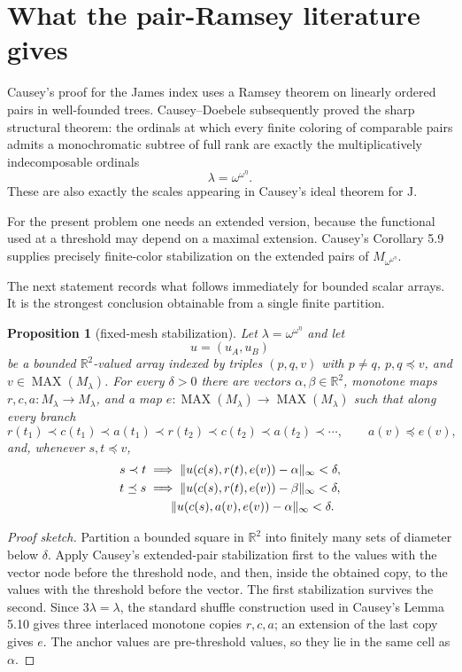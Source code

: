 \documentclass[11pt]{article}
\newtheorem{proposition}[theorem]{Proposition}
\theoremstyle{definition}
\theoremstyle{remark}
\newcommand{\J}{\mathrm{J}}
\newcommand{\MAX}{\operatorname{MAX}}
\newcommand{\R}{\mathbb R}
\begin{document}
\section{What the pair-Ramsey literature gives}

Causey's proof for the James index uses a Ramsey theorem on linearly ordered pairs in well-founded trees.  Causey--Doebele subsequently proved the sharp structural theorem: the ordinals at which every finite coloring of comparable pairs admits a monochromatic subtree of full rank are exactly the multiplicatively indecomposable ordinals
\[
   \lambda=\omega^{\omega^\eta}.
\]
These are also exactly the scales appearing in Causey's ideal theorem for $\J$.

For the present problem one needs an extended version, because the functional used at a threshold may depend on a maximal extension.  Causey's Corollary 5.9 supplies precisely finite-color stabilization on the extended pairs of $M_{\omega^{\omega^\eta}}$.

The next statement records what follows immediately for bounded scalar arrays.  It is the strongest conclusion obtainable from a single finite partition.

\begin{proposition}[fixed-mesh stabilization]\label{prop:fixed-mesh}
Let $\lambda=\omega^{\omega^\eta}$ and let
\[
   u=(u_A,u_B)
\]
be a bounded $\R^2$-valued array indexed by triples $(p,q,v)$ with $p\neq q$, $p,q\preceq v$, and $v\in\MAX(M_\lambda)$.  For every $\delta>0$ there are vectors $\alpha,\beta\in\R^2$, monotone maps $r,c,a:M_\lambda\to M_\lambda$, and a map $e:\MAX(M_\lambda)\to\MAX(M_\lambda)$ such that along every branch
\[
 r(t_1)\prec c(t_1)\prec a(t_1)\prec r(t_2)\prec c(t_2)\prec a(t_2)\prec\cdots,
 \qquad a(v)\preceq e(v),
\]
and, whenever $s,t\preceq v$,
\begin{align*}
 s\prec t&\implies
   \|u(c(s),r(t),e(v))-\alpha\|_\infty<\delta,\\
 t\preceq s&\implies
   \|u(c(s),r(t),e(v))-\beta\|_\infty<\delta,\\
 &\hspace{7mm}\|u(c(s),a(v),e(v))-\alpha\|_\infty<\delta.
\end{align*}
\end{proposition}

\begin{proof}[Proof sketch]
Partition a bounded square in $\R^2$ into finitely many sets of diameter below $\delta$.  Apply Causey's extended-pair stabilization first to the values with the vector node before the threshold node, and then, inside the obtained copy, to the values with the threshold before the vector.  The first stabilization survives the second.  Since $3\lambda=\lambda$, the standard shuffle construction used in Causey's Lemma 5.10 gives three interlaced monotone copies $r,c,a$; an extension of the last copy gives $e$.  The anchor values are pre-threshold values, so they lie in the same cell as $\alpha$.
\end{proof}
\end{document}
